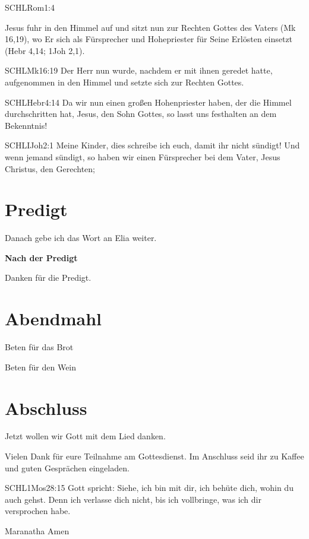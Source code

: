 \documentclass{../../inc/mybib}
\begin{document}
\begin{spacing}{1.5}
\begin{enumerate}
\begin{bibelbox}{SCHL}{Rom}{1:4}
    \end{bibelbox}
    Jesus fuhr in den Himmel auf und sitzt nun zur Rechten Gottes des Vaters (Mk 16,19), wo Er sich als Fürsprecher und Hohepriester für Seine Erlösten einsetzt (Hebr 4,14; 1Joh 2,1).
    \begin{bibelbox}{SCHL}{Mk}{16:19}
    Der Herr nun wurde, nachdem er mit ihnen geredet hatte, aufgenommen in den Himmel und setzte sich zur Rechten Gottes.
    \end{bibelbox}
    \begin{bibelbox}{SCHL}{Hebr}{4:14}
        Da wir nun einen großen Hohenpriester haben, der die Himmel durchschritten hat, Jesus, den Sohn Gottes, so lasst uns festhalten an dem Bekenntnis!
    \end{bibelbox}
    \begin{bibelbox}{SCHL}{IJoh}{2:1}
        Meine Kinder, dies schreibe ich euch, damit ihr nicht sündigt! Und wenn jemand sündigt, so haben wir einen Fürsprecher bei dem Vater, Jesus Christus, den Gerechten;
    \end{bibelbox} 
\end{enumerate}

\end{spacing}

\newpage
\section{Predigt}

Danach gebe ich das Wort an Elia weiter.

\textbf{Nach der Predigt}

Danken für die Predigt.

\section{Abendmahl}

Beten für das Brot


Beten für den Wein


\section{Abschluss}

Jetzt wollen wir Gott mit dem Lied  danken.

Vielen Dank für eure Teilnahme am Gottesdienst. Im Anschluss seid ihr zu Kaffee und guten Gesprächen eingeladen.
\beten{}

\begin{bibelbox}{SCHL}{1Mos}{28:15}
Gott spricht: Siehe, ich bin mit dir,
ich behüte dich, wohin du auch gehst.
Denn ich verlasse dich nicht,
bis ich vollbringe, was ich dir versprochen habe.
\end{bibelbox}

Maranatha Amen
\end{document}
